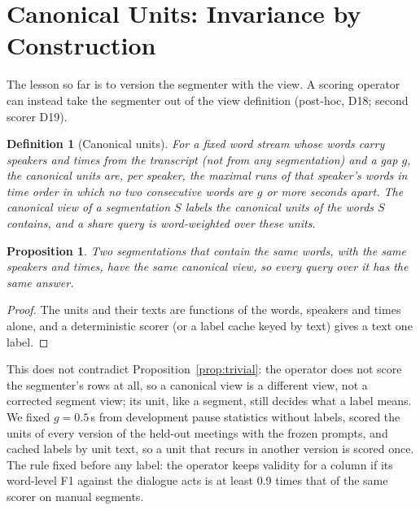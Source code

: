 \documentclass[conference]{IEEEtran}
\newtheorem{definition}{Definition}
\newtheorem{proposition}{Proposition}
\begin{document}
\section{Canonical Units: Invariance by Construction}\label{sec:canon}
The lesson so far is to version the segmenter with the view. A scoring operator can instead take the segmenter out of
the view definition (post-hoc, D18; second scorer D19).
\begin{definition}[Canonical units]
For a fixed word stream whose words carry speakers and times from the transcript (not from any segmentation) and a
gap $g$, the canonical units are, per speaker, the maximal runs of that
speaker's words in time order in which no two consecutive words are $g$ or more seconds apart. The canonical view of a
segmentation $S$ labels the canonical units of the words $S$ contains, and a share query is word-weighted over these
units.
\end{definition}
\begin{proposition}\label{prop:canon}
Two segmentations that contain the same words, with the same speakers and times, have the same canonical view, so
every query over it has the same answer.
\end{proposition}
\begin{proof}
The units and their texts are functions of the words, speakers and times alone, and a deterministic scorer (or a
label cache keyed by text) gives a text one label.
\end{proof}
This does not contradict Proposition~\ref{prop:trivial}: the operator does not score the segmenter's rows at all, so
a canonical view is a different view, not a corrected segment view; its unit, like a segment, still decides what a
label means. We fixed $g=0.5$\,s from development pause statistics without labels, scored the units of every version of
the held-out meetings with the frozen prompts, and cached labels by unit text, so a unit that recurs in another version
is scored once. The rule fixed before any label: the operator keeps validity for a column if its word-level F1 against
the dialogue acts is at least 0.9 times that of the same scorer on manual segments.
\end{document}

